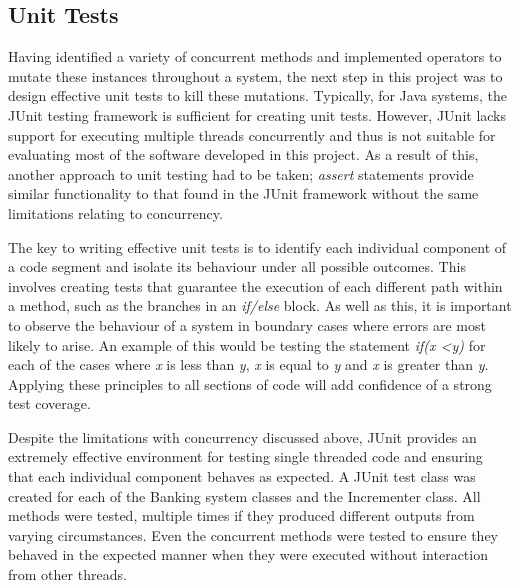 \documentclass[a4paper,12pt]{article}
\begin{document}
\subsection{Unit Tests} \label{section:Unit Tests}

Having identified a variety of concurrent methods and implemented operators to mutate these instances throughout a system, the next step in this project was to design effective unit tests to kill these mutations. Typically, for Java systems, the JUnit testing framework is sufficient for creating unit tests. However, JUnit lacks support for executing multiple threads concurrently and thus is not suitable for evaluating most of the software developed in this project. As a result of this, another approach to unit testing had to be taken; \textit{assert} statements provide similar functionality to that found in the JUnit framework without the same limitations relating to concurrency.

The key to writing effective unit tests is to identify each individual component of a code segment and isolate its behaviour under all possible outcomes. This involves creating tests that guarantee the execution of each different path within a method, such as the branches in an \textit{if/else} block. As well as this, it is important to observe the behaviour of a system in boundary cases where errors are most likely to arise. An example of this would be testing the statement \textit{if(x \textless y)} for each of the cases where \textit{x} is less than \textit{y}, \textit{x} is equal to \textit{y} and \textit{x} is greater than \textit{y}. Applying these principles to all sections of code will add confidence of a strong test coverage.   

Despite the limitations with concurrency discussed above, JUnit provides an extremely effective environment for testing single threaded code and ensuring that each individual component behaves as expected. A JUnit test class was created for each of the Banking system classes and the Incrementer class. All methods were tested, multiple times if they produced different outputs from varying circumstances. Even the concurrent methods were tested to ensure they behaved in the expected manner when they were executed without interaction from other threads. 
\end{document}
